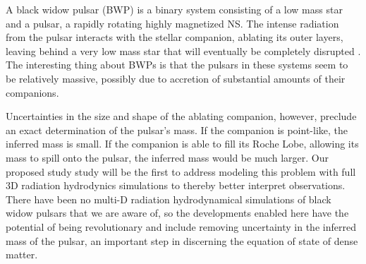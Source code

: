 A black widow pulsar (BWP) is a binary system consisting of a low mass
star and a pulsar, a rapidly rotating highly magnetized NS.  
The intense radiation from the pulsar interacts with the stellar companion,
ablating its outer layers, leaving behind a very low mass star that 
will eventually be completely disrupted 
\cite [See][and references therein]{bednareksitarek2013}. The interesting 
thing about 
BWPs is that the pulsars in these systems seem to be relatively massive, 
possibly due to accretion of substantial amounts of their companions. 

Uncertainties in the size and shape of the ablating companion, however, 
preclude an exact determination of the pulsar's mass. If the companion is 
point-like, the inferred mass is small.  If the companion is able to fill 
its Roche Lobe, allowing its mass to spill onto the pulsar, the inferred 
mass would be much larger. Our proposed study study will be the first 
to address modeling this problem with full 3D radiation hydrodynics
simulations to thereby better interpret observations. There have been 
no multi-D radiation hydrodynamical simulations 
of black widow pulsars that we are aware of, so the developments enabled 
here have the potential of being revolutionary and include removing
uncertainty in the inferred mass of the pulsar, an important step
in discerning the equation of state of dense matter.


